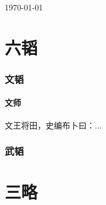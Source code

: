 \documentclass[11pt]{ctexart}
\begin{document}

\today
\tableofcontents

\part{六韬}
\section{文韬}
\subsection{文师}
文王将田，史编布卜曰：...
\section{武韬}

\part{三略}
\end{document}
